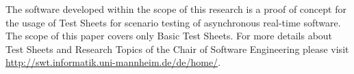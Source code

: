The software developed within the scope of this research is a proof of concept for the usage of Test Sheets for scenario testing of asynchronous real-time software. The scope of this paper covers only Basic Test Sheets. For more details about Test Sheets and Research Topics of the Chair of Software Engineering please visit \url{http://swt.informatik.uni-mannheim.de/de/home/}.



